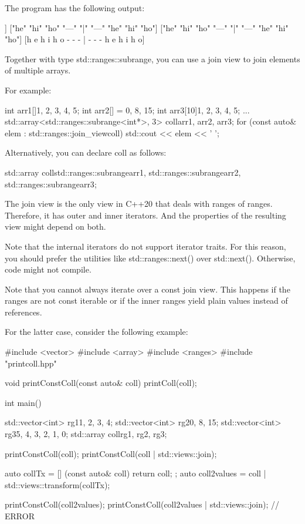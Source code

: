 The program has the following output:

\begin{shell}
[["he" "hi" "ho"] ["---" "|" "---"] ["he" "hi" "ho"]]
["he" "hi" "ho" "---" "|" "---" "he" "hi" "ho"]
["he" "hi" "ho" "---" "|" "---" "he" "hi" "ho"]
[h e h i h o - - - | - - - h e h i h o]
\end{shell}

Together with type std::ranges::subrange, you can use a join view to join elements of multiple arrays.

For example:

\begin{cpp}
int arr1[]{1, 2, 3, 4, 5};
int arr2[] = {0, 8, 15};
int arr3[10]{1, 2, 3, 4, 5};
...
std::array<std::ranges::subrange<int*>, 3> coll{arr1, arr2, arr3};
for (const auto& elem : std::ranges::join_view{coll}) {
	std::cout << elem << ' ';
}
\end{cpp}

Alternatively, you can declare coll as follows:

\begin{cpp}
std::array coll{std::ranges::subrange{arr1},
				std::ranges::subrange{arr2},
				std::ranges::subrange{arr3}};
\end{cpp}

The join view is the only view in C++20 that deals with ranges of ranges. Therefore, it has outer and inner iterators. And the properties of the resulting view might depend on both.

Note that the internal iterators do not support iterator traits. For this reason, you should prefer the utilities like std::ranges::next() over std::next(). Otherwise, code might not compile.


Note that you cannot always iterate over a const join view. This happens if the ranges are not const iterable or if the inner ranges yield plain values instead of references.

For the latter case, consider the following example:


\begin{cpp}
#include <vector>
#include <array>
#include <ranges>
#include "printcoll.hpp"

void printConstColl(const auto& coll)
{
	printColl(coll);
}

int main()
{
	std::vector<int> rg1{1, 2, 3, 4};
	std::vector<int> rg2{0, 8, 15};
	std::vector<int> rg3{5, 4, 3, 2, 1, 0};
	std::array coll{rg1, rg2, rg3};
	
	printConstColl(coll);
	printConstColl(coll | std::views::join);
	
	auto collTx = [] (const auto& coll) { return coll; };
	auto coll2values = coll | std::views::transform(collTx);
	
	printConstColl(coll2values);
	printConstColl(coll2values | std::views::join); // ERROR
}
\end{cpp}


